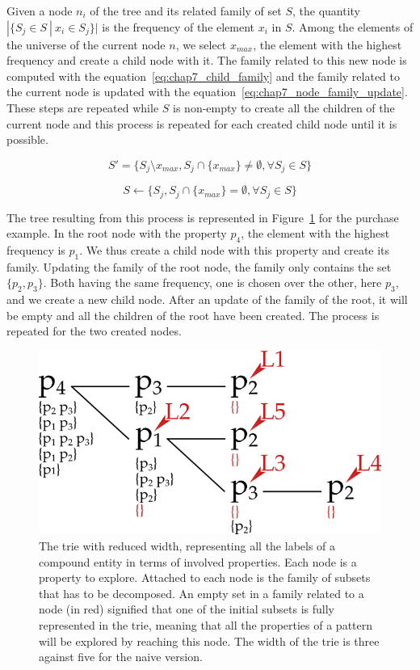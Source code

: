 Given a node $n_i$ of the tree and its related family of set $S$, the quantity $|\{S_j \in S ~|~ x_i \in S_j \}|$ is the frequency of the element $x_i$ in $S$. Among the elements of the universe of the current node $n$, we select $x_{max}$, the element with the highest frequency and create a child node with it. The family related to this new node is computed with the equation~\eqref{eq:chap7_child_family} and the family related to the current node is updated with the equation~\eqref{eq:chap7_node_family_update}. These steps are repeated while $S$ is non-empty to create all the children of the current node and this process is repeated for each created child node until it is possible.

\begin{equation}
S' = \{S_j \setminus x_{max}, S_j \cap \{x_{max}\} \neq \emptyset, \forall S_j \in S\}
\label{eq:chap7_child_family}
\end{equation}

\begin{equation}
S \leftarrow \{S_j, S_j \cap \{x_{max}\} = \emptyset, \forall S_j \in S\}
\label{eq:chap7_node_family_update}
\end{equation}

The tree resulting from this process is represented in Figure~\ref{fig:chap7_advanced} for the purchase example. In the root node with the property $p_4$, the element with the highest frequency is $p_1$. We thus create a child node with this property and create its family. Updating the family of the root node, the family only contains the set $\{p_2, p_3\}$. Both having the same frequency, one is chosen over the other, here $p_3$, and we create a new child node. After an update of the family of the root, it will be empty and all the children of the root have been created. The process is repeated for the two created nodes.

\begin{figure}[ht!]
\centering
\includegraphics[scale=0.45]{figures/chapter7/advanced.png}
\caption{\label{fig:chap7_advanced} The trie with reduced width, representing all the labels of a compound entity in terms of involved properties. Each node is a property to explore. Attached to each node is the family of subsets that has to be decomposed. An empty set in a family related to a node (in red) signified that one of the initial subsets is fully represented in the trie, meaning that all the properties of a pattern will be explored by reaching this node. The width of the trie is three against five for the naive version.}
\end{figure}

